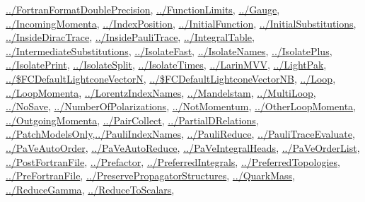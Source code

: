 \documentclass[../FeynCalcManual.tex]{subfiles}
\begin{document}
\begin{itemize}
  \hyperlink{../fortranformatdoubleprecision}{../FortranFormatDoublePrecision},
  \hyperlink{../functionlimits}{../FunctionLimits},
  \hyperlink{../gauge}{../Gauge},
  \hyperlink{../incomingmomenta}{../IncomingMomenta},
  \hyperlink{../indexposition}{../IndexPosition},
  \hyperlink{../initialfunction}{../InitialFunction},
  \hyperlink{../initialsubstitutions}{../InitialSubstitutions},
  \hyperlink{../insidediractrace}{../InsideDiracTrace},
  \hyperlink{../insidepaulitrace}{../InsidePauliTrace},
  \hyperlink{../integraltable}{../IntegralTable},
  \hyperlink{../intermediatesubstitutions}{../IntermediateSubstitutions},
  \hyperlink{../isolatefast}{../IsolateFast},
  \hyperlink{../isolatenames}{../IsolateNames},
  \hyperlink{../isolateplus}{../IsolatePlus},
  \hyperlink{../isolateprint}{../IsolatePrint},
  \hyperlink{../isolatesplit}{../IsolateSplit},
  \hyperlink{../isolatetimes}{../IsolateTimes},
  \hyperlink{../larinmvv}{../LarinMVV},
  \hyperlink{../lightpak}{../LightPak},
  \hyperlink{../dollarfcdefaultlightconevectorn}{../\$FCDefaultLightconeVectorN},
  \hyperlink{../dollarfcdefaultlightconevectornb}{../\$FCDefaultLightconeVectorNB},
  \hyperlink{../loop}{../Loop},
  \hyperlink{../loopmomenta}{../LoopMomenta},
  \hyperlink{../lorentzindexnames}{../LorentzIndexNames},
  \hyperlink{../mandelstam}{../Mandelstam},
  \hyperlink{../multiloop}{../MultiLoop},
  \hyperlink{../nosave}{../NoSave},
  \hyperlink{../numberofpolarizations}{../NumberOfPolarizations},
  \hyperlink{../notmomentum}{../NotMomentum},
  \hyperlink{../otherloopmomenta}{../OtherLoopMomenta},
  \hyperlink{../outgoingmomenta}{../OutgoingMomenta},
  \hyperlink{../paircollect}{../PairCollect},
  \hyperlink{../partialdrelations}{../PartialDRelations},
  \hyperlink{../patchmodelsonly}{../PatchModelsOnly},\hyperlink{../pauliindexnames}{../PauliIndexNames},
  \hyperlink{../paulireduce}{../PauliReduce},
  \hyperlink{../paulitraceevaluate}{../PauliTraceEvaluate},
  \hyperlink{../paveautoorder}{../PaVeAutoOrder},
  \hyperlink{../paveautoreduce}{../PaVeAutoReduce},
  \hyperlink{../paveintegralheads}{../PaVeIntegralHeads},
  \hyperlink{../paveorderlist}{../PaVeOrderList},
  \hyperlink{../postfortranfile}{../PostFortranFile},
  \hyperlink{../prefactor}{../Prefactor},
  \hyperlink{../preferredintegrals}{../PreferredIntegrals},
  \hyperlink{../preferredtopologies}{../PreferredTopologies},
  \hyperlink{../prefortranfile}{../PreFortranFile},
  \hyperlink{../preservepropagatorstructures}{../PreservePropagatorStructures},
  \hyperlink{../quarkmass}{../QuarkMass},
  \hyperlink{../reducegamma}{../ReduceGamma},
  \hyperlink{../reducetoscalars}{../ReduceToScalars},

\end{itemize}
\end{document}
